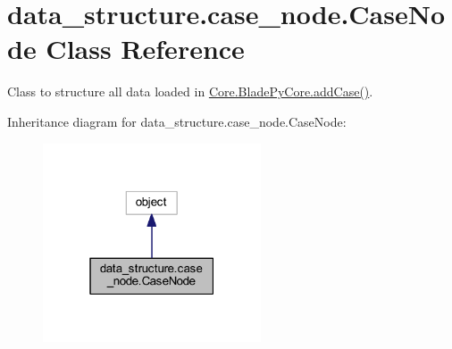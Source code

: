 \hypertarget{classdata__structure_1_1case__node_1_1_case_node}{}\section{data\+\_\+structure.\+case\+\_\+node.\+Case\+Node Class Reference}
\label{classdata__structure_1_1case__node_1_1_case_node}


Class to structure all data loaded in \hyperlink{class_core_1_1_blade_py_core_a1a62f9b5b8f5929bdb6f0a8c27049d9e}{Core.\+Blade\+Py\+Core.\+add\+Case()}.  




Inheritance diagram for data\+\_\+structure.\+case\+\_\+node.\+Case\+Node\+:\nopagebreak
\begin{figure}[H]
\begin{center}
\leavevmode
\includegraphics[width=183pt]{classdata__structure_1_1case__node_1_1_case_node__inherit__graph}
\end{center}
\end{figure}
